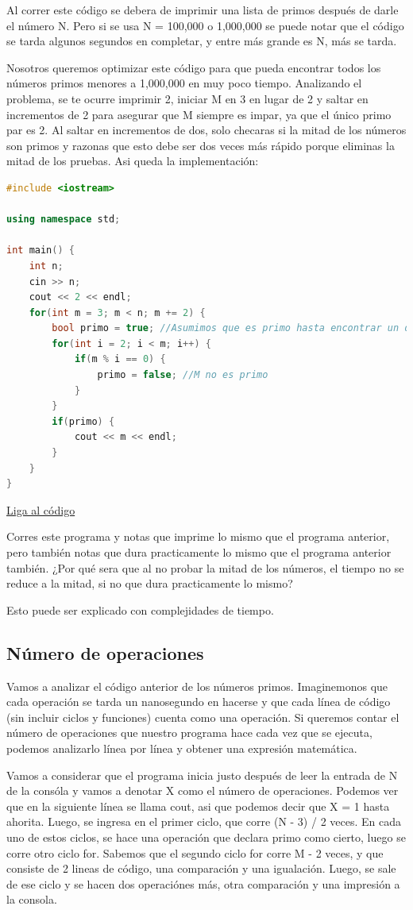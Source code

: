 \documentclass{article}
\begin{document}
Al correr este código se debera de imprimir una lista de primos después de darle el número N. Pero si se usa N = 100,000 o 1,000,000 se puede notar que el código se tarda algunos segundos en completar, y entre más grande es N, más se tarda.

Nosotros queremos optimizar este código para que pueda encontrar todos los números primos menores a 1,000,000 en muy poco tiempo. Analizando el problema, se te ocurre imprimir 2, iniciar M en 3 en lugar de 2 y saltar en incrementos de 2 para asegurar que M siempre es impar, ya que el único primo par es 2. Al saltar en incrementos de dos, solo checaras si la mitad de los números son primos y razonas que esto debe ser dos veces más rápido porque eliminas la mitad de los pruebas. Asi queda la implementación:

\begin{lstlisting}[language=C++, title=¿Optimizando?]
#include <iostream>

using namespace std;

int main() {
	int n;
	cin >> n;
	cout << 2 << endl;
	for(int m = 3; m < n; m += 2) {
		bool primo = true; //Asumimos que es primo hasta encontrar un divisor
		for(int i = 2; i < m; i++) {
			if(m % i == 0) {
				primo = false; //M no es primo
			}
		}
		if(primo) {
			cout << m << endl;
		}
	}
}
\end{lstlisting}
\href{https://repl.it/@Jamesscn/Programa-ineficiente}{Liga al código}

Corres este programa y notas que imprime lo mismo que el programa anterior, pero también notas que dura practicamente lo mismo que el programa anterior también. ¿Por qué sera que al no probar la mitad de los números, el tiempo no se reduce a la mitad, si no que dura practicamente lo mismo?

Esto puede ser explicado con complejidades de tiempo.

\subsection{Número de operaciones}

Vamos a analizar el código anterior de los números primos. Imaginemonos que cada operación se tarda un nanosegundo en hacerse y que cada línea de código (sin incluir ciclos y funciones) cuenta como una operación. Si queremos contar el número de operaciones que nuestro programa hace cada vez que se ejecuta, podemos analizarlo línea por línea y obtener una expresión matemática.

Vamos a considerar que el programa inicia justo después de leer la entrada de N de la consóla y vamos a denotar X como el número de operaciones. Podemos ver que en la siguiente línea se llama cout, asi que podemos decir que X = 1 hasta ahorita. Luego, se ingresa en el primer ciclo, que corre (N - 3) / 2 veces. En cada uno de estos ciclos, se hace una operación que declara primo como cierto, luego se corre otro ciclo for. Sabemos que el segundo ciclo for corre M - 2 veces, y que consiste de 2 lineas de código, una comparación y una igualación. Luego, se sale de ese ciclo y se hacen dos operaciónes más, otra comparación y una impresión a la consola.
\end{document}
